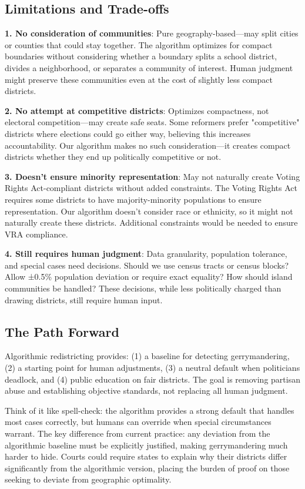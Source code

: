 \documentclass[11pt]{article}
\begin{document}
\subsection{Limitations and Trade-offs}

\textbf{1. No consideration of communities}: Pure geography-based—may split cities or counties that could stay together. The algorithm optimizes for compact boundaries without considering whether a boundary splits a school district, divides a neighborhood, or separates a community of interest. Human judgment might preserve these communities even at the cost of slightly less compact districts.

\textbf{2. No attempt at competitive districts}: Optimizes compactness, not electoral competition—may create safe seats. Some reformers prefer "competitive" districts where elections could go either way, believing this increases accountability. Our algorithm makes no such consideration—it creates compact districts whether they end up politically competitive or not.

\textbf{3. Doesn't ensure minority representation}: May not naturally create Voting Rights Act-compliant districts without added constraints. The Voting Rights Act requires some districts to have majority-minority populations to ensure representation. Our algorithm doesn't consider race or ethnicity, so it might not naturally create these districts. Additional constraints would be needed to ensure VRA compliance.

\textbf{4. Still requires human judgment}: Data granularity, population tolerance, and special cases need decisions. Should we use census tracts or census blocks? Allow ±0.5\% population deviation or require exact equality? How should island communities be handled? These decisions, while less politically charged than drawing districts, still require human input.

\subsection{The Path Forward}

Algorithmic redistricting provides: (1) a baseline for detecting gerrymandering, (2) a starting point for human adjustments, (3) a neutral default when politicians deadlock, and (4) public education on fair districts. The goal is removing partisan abuse and establishing objective standards, not replacing all human judgment.

Think of it like spell-check: the algorithm provides a strong default that handles most cases correctly, but humans can override when special circumstances warrant. The key difference from current practice: any deviation from the algorithmic baseline must be explicitly justified, making gerrymandering much harder to hide. Courts could require states to explain why their districts differ significantly from the algorithmic version, placing the burden of proof on those seeking to deviate from geographic optimality.
\end{document}
